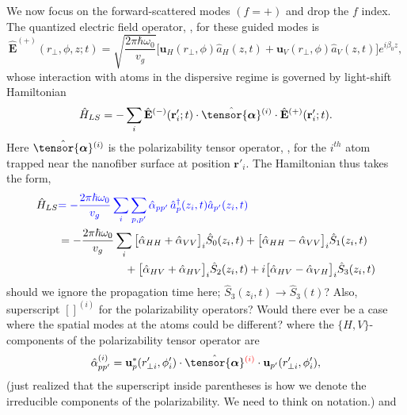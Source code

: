 \documentclass[preprint,aps,pra,onecolumn]{revtex4-1} %
\newcommand{\poltens}{\hat{\tensor{\boldsymbol{\alpha}}}}
\newcommand{\comment}[1]{{\color{Maroon} #1}}
\newcommand{\error}[1]{{\color{red} #1}}
\begin{document}
We now focus on the forward-scattered modes $(f=+)$ and drop the $f$ index. The quantized electric field operator, , for these guided modes is
\begin{equation}
\hat{\mathbf{E}}^{(+)}(r\!_\perp,\phi,z;t) = \sqrt{ \frac{2 \pi \hbar \omega_0}{ v_g} } \Big[ \mathbf{u}_H(r\!_\perp,\phi) \hat{a}_H(z,t) + \mathbf{u}_V(r\!_\perp,\phi) \hat{a}_V(z,t) \Big] e^{i \beta_0 z},
\end{equation}
whose interaction with atoms in the dispersive regime is governed by  light-shift Hamiltonian~\cite{deutsch_quantum_2010,kien_dynamical_2013}
\begin{equation}  
	\hat{H}_{LS}   = - \sum_i \hat{\mathbf{E}}^{(-)}(\mathbf{r}'_i ; t ) \cdot \poltens\phantom{}^{(i)} \cdot \hat{\mathbf{E}}^{(+)}(\mathbf{r}'_i;t ).
\end{equation}
Here $\poltens\phantom{}^{(i)}$ is the polarizability tensor operator, , for the $i^{th}$ atom trapped near the nanofiber surface at position $\mathbf{r}'_i$. The Hamiltonian thus takes the form,
\begin{align}  
	\hat{H}_{LS}   & {\color{blue} = -\frac{2 \pi \hbar \omega_0}{v_g} \sum_i \sum_{p,p'} \hat{\alpha}_{p p'}\, \hat{a}_{p}^\dag(z_i,t)  \hat{a}_{p'}(z_i,t) } \\
	& = -\frac{2 \pi \hbar \omega_0}{v_g} \sum_i   \big[\hat{\alpha}_{HH}+\hat{\alpha}_{VV} \big]_i \hat{S}_0(z_i,t) +  \big[\hat{\alpha}_{HH}-\hat{\alpha}_{VV} \big]_i \hat{S}_1(z_i,t) \label{Eq::GenHamiltonian} \\
	&\quad \quad \quad \quad \quad \quad+ \big[\hat{\alpha}_{HV}+\hat{\alpha}_{HV} \big]_i \hat{S}_2(z_i,t) + i  \big[\hat{\alpha}_{HV}-\hat{\alpha}_{VH} \big]_i \hat{S}_3(z_i,t)  \nonumber
	\end{align}
\comment{should we ignore the propagation time here; $\hat{S}_3(z_i,t) \rightarrow \hat{S}_3(t)$?  Also, superscript ${[]}^{(i)}$ for the polarizability operators?  Would there ever be a case where the spatial modes at the atoms could be different?}  where the $\{H,V\}$-components of the polarizability tensor operator are
\begin{equation}  
	\hat{\alpha}_{p p'}^{(i)}= \mathbf{u}^*_p(r'_{\perp i},\phi'_i)  \cdot \poltens\phantom{}^\error{(i)} \cdot \mathbf{u}_{p'}(r'_{\perp i},\phi'_i),
\end{equation}
\error{(just realized that the superscript inside parentheses is how we denote the irreducible components of the polarizability.  We need to think on notation.)} and
\end{document}
